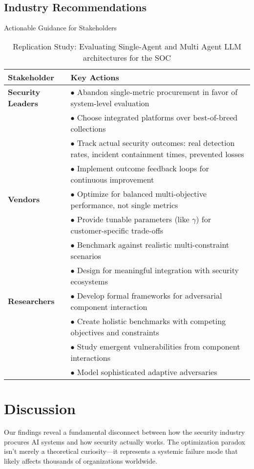 \documentclass[10pt,conference]{IEEEtran}
\begin{document}
\subsection{Industry Recommendations}

\begin{table*}[!ht]
\centering
\caption{Actionable Guidance for Stakeholders}
\footnotesize
\begin{tabular}{@{}lp{11cm}@{}}
\toprule
\textbf{Stakeholder} & \textbf{Key Actions} \\
\midrule
\textbf{Security Leaders} &
$\bullet$ Abandon single-metric procurement in favor of system-level evaluation\\
& $\bullet$ Choose integrated platforms over best-of-breed collections\\
& $\bullet$ Track actual security outcomes: real detection rates, incident containment times, prevented losses\\
& $\bullet$ Implement outcome feedback loops for continuous improvement\\
\midrule
\textbf{Vendors} &
$\bullet$ Optimize for balanced multi-objective performance, not single metrics\\
& $\bullet$ Provide tunable parameters (like $\gamma$) for customer-specific trade-offs\\
& $\bullet$ Benchmark against realistic multi-constraint scenarios\\
& $\bullet$ Design for meaningful integration with security ecosystems\\
\midrule
\textbf{Researchers} &
$\bullet$ Develop formal frameworks for adversarial component interaction\\
& $\bullet$ Create holistic benchmarks with competing objectives and constraints\\
& $\bullet$ Study emergent vulnerabilities from component interactions\\
& $\bullet$ Model sophisticated adaptive adversaries\\
\bottomrule
\end{tabular}
    \caption{Replication Study: Evaluating Single-Agent and Multi Agent LLM architectures for the SOC}
\end{table*}


\section{Discussion}

Our findings reveal a fundamental disconnect between how the security industry procures AI systems and how security actually works. The optimization paradox isn't merely a theoretical curiosity---it represents a systemic failure mode that likely affects thousands of organizations worldwide.
\end{document}
